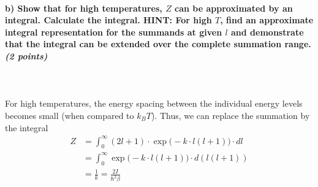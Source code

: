 \paragraph{b) Show that for high temperatures, $Z$ can be approximated 
    by an integral. Calculate the integral. HINT: For high $T$, find an 
    approximate integral representation for the summands at given $l$ and
    demonstrate that the integral can be extended over the complete 
    summation range. \textit{(2 points)}
} \ \\
\\
    For high temperatures, the energy spacing between the 
    individual energy levels becomes small (when compared to 
    $k_BT$). Thus, we can replace the summation by the integral
    \begin{align}
        Z
        &=\int_0^\infty (2l+1)\cdot\exp\bigg(
            -k\cdot l(l+1)
        \bigg)\cdot dl \\
        &=\int_0^\infty \exp\bigg(
            -k\cdot l(l+1)
        \bigg)\cdot d(l(l+1)) \\
        &=\frac{1}{k}=\frac{2I}{\hbar^2\beta}
    \end{align}

